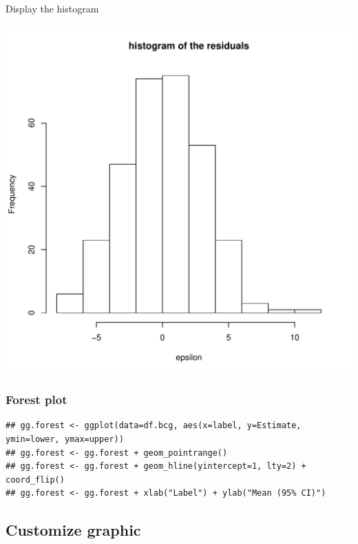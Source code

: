 \documentclass{article}
\begin{document}
Display the histogram
\begin{center}
\includegraphics[width=.9\linewidth]{./figures/fig-hist-residuals.pdf}
\end{center}
\subsubsection{Forest plot}
\label{sec:orgb01f75f}
\lstset{language=r,label= ,caption= ,captionpos=b,numbers=none}
\begin{lstlisting}
## gg.forest <- ggplot(data=df.bcg, aes(x=label, y=Estimate, ymin=lower, ymax=upper))
## gg.forest <- gg.forest + geom_pointrange()
## gg.forest <- gg.forest + geom_hline(yintercept=1, lty=2) + coord_flip()
## gg.forest <- gg.forest + xlab("Label") + ylab("Mean (95% CI)") 
\end{lstlisting}

\subsection{Customize graphic}
\label{sec:org12440fe}
\end{document}
